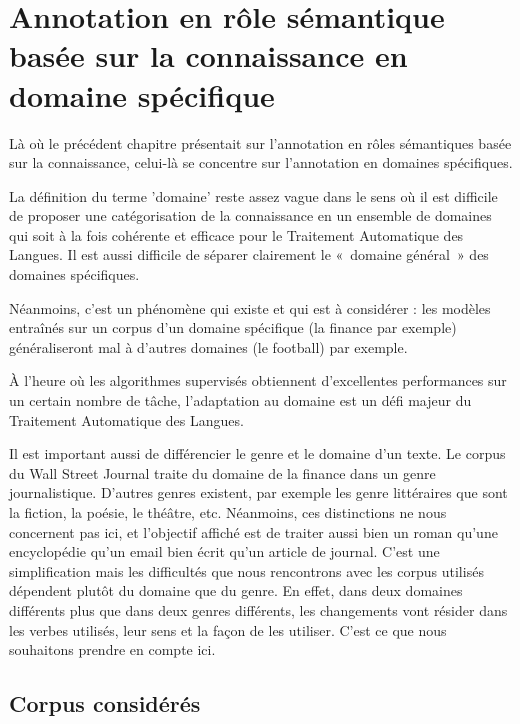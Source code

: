 \chapter{Annotation en rôle sémantique basée sur la connaissance en domaine spécifique}
\label{ch:domainsrl}

Là où le précédent chapitre présentait sur l'annotation en rôles sémantiques
basée sur la connaissance, celui-là se concentre sur l'annotation en domaines
spécifiques.

La définition du terme 'domaine' reste assez vague dans le sens où il est
difficile de proposer une catégorisation de la connaissance en un ensemble de
domaines qui soit à la fois cohérente et efficace pour le Traitement Automatique
des Langues. Il est aussi difficile de séparer clairement le «~domaine
général~» des domaines spécifiques.


Néanmoins, c'est un phénomène qui existe et qui est à considérer : les modèles
entraînés sur un corpus d'un domaine spécifique (la finance par exemple)
généraliseront mal à d'autres domaines (le football) par exemple. %

À l'heure où les algorithmes supervisés obtiennent d'excellentes performances
sur un certain nombre de tâche, l'adaptation au domaine est un défi majeur du
Traitement Automatique des Langues.

Il est important aussi de différencier le genre et le domaine d'un texte. Le
corpus du Wall Street Journal traite du domaine de la finance dans un genre
journalistique. D'autres genres existent, par exemple les genre littéraires que
sont la fiction, la poésie, le théâtre, etc. Néanmoins, ces distinctions ne
nous concernent pas ici, et l'objectif affiché est de traiter aussi bien un
roman qu'une encyclopédie qu'un email bien écrit qu'un article de journal.
C'est une simplification mais les difficultés que nous rencontrons avec les
corpus utilisés dépendent plutôt du domaine que du genre. En effet, dans deux
domaines différents plus que dans deux genres différents, les changements vont
résider dans les verbes utilisés, leur sens et la façon de les utiliser. C'est
ce que nous souhaitons prendre en compte ici.

\section{Corpus considérés}

